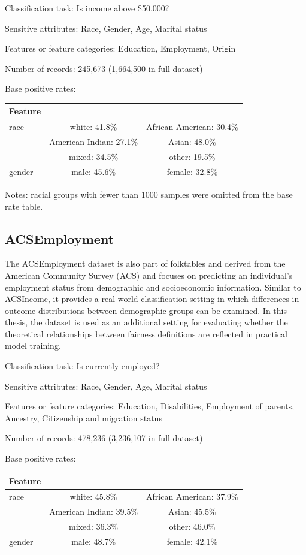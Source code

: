 Classification task: Is income above \$50.000?

Sensitive attributes: Race, Gender, Age, Marital status

Features or feature categories: Education, Employment, Origin

Number of records: 245,673 (1,664,500 in full dataset)

Base positive rates:
\begin{table}[htbp]{}
    \begin{tabular}{l|cc}
        \hline
        Feature &  & \\
        \hline
        race & white: 41.8\% & African American: 30.4\%\\
        & American Indian: 27.1\% & Asian: 48.0\%\\
        & mixed: 34.5\% & other: 19.5\%\\
        gender & male: 45.6\% & female: 32.8\%\\
         \hline
    \end{tabular}
\end{table}

Notes: racial groups with fewer than 1000 samples were omitted from the base rate table.


\subsection{ACSEmployment}
The ACSEmployment dataset is also part of folktables \cite{folktables} and derived from the American Community Survey (ACS) and focuses on predicting an individual's employment status from demographic and socioeconomic information. Similar to ACSIncome, it provides a real-world classification setting in which differences in outcome distributions between demographic groups can be examined. In this thesis, the dataset is used as an additional setting for evaluating whether the theoretical relationships between fairness definitions are reflected in practical model training.

Classification task: Is currently employed?

Sensitive attributes: Race, Gender, Age, Marital status

Features or feature categories: Education, Disabilities, Employment of parents, Ancestry, Citizenship and migration status

Number of records: 478,236 (3,236,107 in full dataset)

Base positive rates:
\begin{table}[htbp]{}
    \begin{tabular}{l|cc}
        \hline
        Feature &  & \\
        \hline
        race & white: 45.8\% & African American: 37.9\%\\
        & American Indian: 39.5\% & Asian: 45.5\%\\
        & mixed: 36.3\% & other: 46.0\%\\
        gender & male: 48.7\% & female: 42.1\%\\
         \hline
    \end{tabular}
\end{table}

